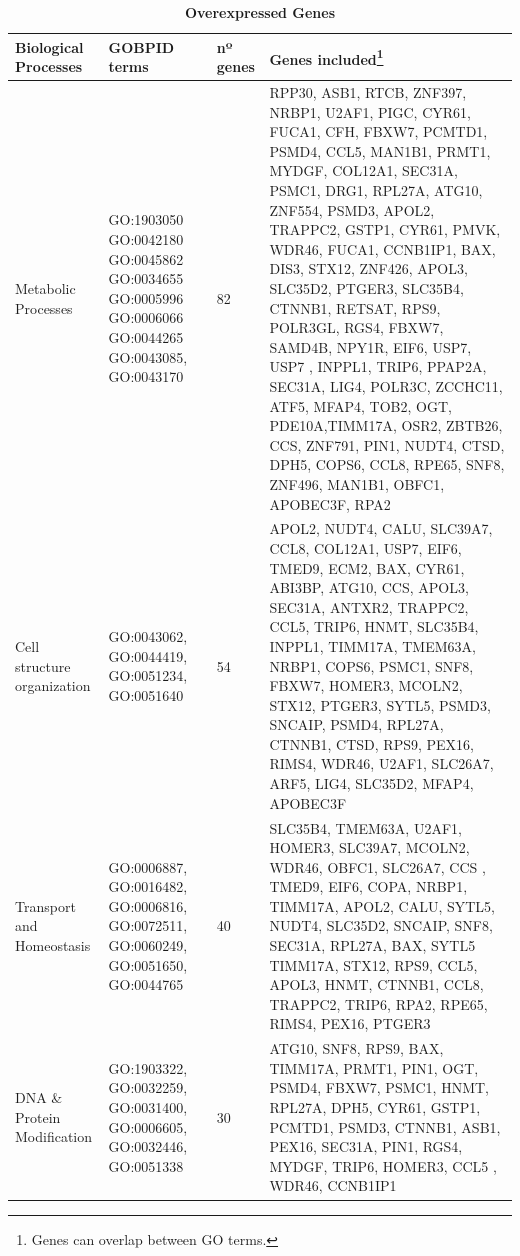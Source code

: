 \documentclass[9pt,twocolumn,twoside]{gsajnl}
\begin{document}
\pagebreak
 

\begin{table}[htbp]
\centering
\caption{\bf Overexpressed Genes}
\begin{tableminipage}{\textwidth}
\begin{tabularx}{\textwidth}{m{3cm}m{3.5cm}m{1.2cm}m{9.2cm}}
\hline
Biological Processes & GOBPID terms & nº genes & Genes included\footnote{Genes can overlap between GO terms.} \\
\hline

Metabolic Processes & GO:1903050  GO:0042180  GO:0045862  GO:0034655  GO:0005996  GO:0006066  GO:0044265  GO:0043085, GO:0043170 & 82 &  RPP30, ASB1, RTCB, ZNF397, NRBP1, U2AF1, PIGC,  CYR61,  FUCA1, CFH, FBXW7, PCMTD1, PSMD4, CCL5, MAN1B1, PRMT1, MYDGF, COL12A1, SEC31A, PSMC1, DRG1, RPL27A, ATG10, ZNF554, PSMD3, APOL2, TRAPPC2, GSTP1, CYR61,  PMVK, WDR46, FUCA1, CCNB1IP1, BAX, DIS3, STX12, ZNF426, APOL3, SLC35D2, PTGER3, SLC35B4, CTNNB1, RETSAT, RPS9, POLR3GL, RGS4,  FBXW7, SAMD4B, NPY1R, EIF6, USP7, USP7 , INPPL1, TRIP6, PPAP2A,  SEC31A, LIG4, POLR3C, ZCCHC11, ATF5, MFAP4, TOB2, OGT,  PDE10A,TIMM17A, OSR2, ZBTB26, CCS, ZNF791, PIN1, NUDT4, CTSD, DPH5, COPS6, CCL8, RPE65, SNF8, ZNF496,  MAN1B1, OBFC1, APOBEC3F, RPA2\\

Cell structure organization & GO:0043062, GO:0044419, GO:0051234, GO:0051640 & 54 & APOL2, NUDT4, CALU, SLC39A7, CCL8, COL12A1, USP7, EIF6, TMED9, ECM2, BAX, CYR61, ABI3BP, ATG10, CCS, APOL3, SEC31A, ANTXR2, TRAPPC2, CCL5, TRIP6, HNMT, SLC35B4, INPPL1, TIMM17A, TMEM63A, NRBP1, COPS6, PSMC1, SNF8, FBXW7, HOMER3, MCOLN2, STX12, PTGER3, SYTL5, PSMD3, SNCAIP, PSMD4, RPL27A, CTNNB1, CTSD, RPS9, PEX16, RIMS4, WDR46, U2AF1, SLC26A7, ARF5, LIG4, SLC35D2, MFAP4, APOBEC3F\\

Transport and Homeostasis & GO:0006887, GO:0016482, GO:0006816, GO:0072511, GO:0060249,  GO:0051650, GO:0044765 & 40 & SLC35B4, TMEM63A, U2AF1, HOMER3, SLC39A7, MCOLN2, WDR46, OBFC1, SLC26A7, CCS  , TMED9, EIF6, COPA, NRBP1, TIMM17A, APOL2, CALU, SYTL5, NUDT4, SLC35D2, SNCAIP, SNF8, SEC31A, RPL27A, BAX, SYTL5  TIMM17A, STX12, RPS9, CCL5, APOL3, HNMT,  CTNNB1, CCL8, TRAPPC2, TRIP6, RPA2, RPE65, RIMS4, PEX16, PTGER3\\

DNA \& Protein Modification & GO:1903322, GO:0032259, GO:0031400, GO:0006605, GO:0032446, GO:0051338 & 30 & ATG10, SNF8, RPS9, BAX, TIMM17A, PRMT1, PIN1, OGT, PSMD4, FBXW7, PSMC1, HNMT, RPL27A, DPH5, CYR61, GSTP1,  PCMTD1, PSMD3,  CTNNB1, ASB1, PEX16, SEC31A, PIN1, RGS4, MYDGF, TRIP6, HOMER3, CCL5 , WDR46, CCNB1IP1\\


\end{tabularx}
\end{tableminipage}
\end{table}
\end{document}
